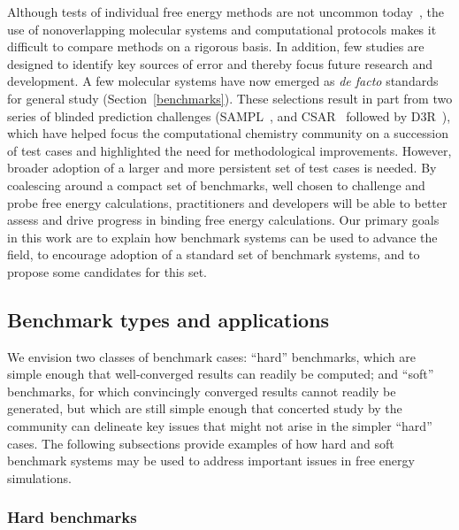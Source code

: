 \documentclass[aps,pre,twocolumn,nofootinbib,superscriptaddress,10pt, final,tightenlines]{revtex4-1}
\begin{document}
Although tests of individual free energy methods are not uncommon today~\cite{mikulskis_large-scale_2014, schrodinger_accurate_2015, christ_binding_2016, cui_affinity_2016, verras_free_2016}, the use of nonoverlapping molecular systems and computational protocols makes it difficult to compare methods on a rigorous basis.
In addition, few studies are designed to identify key sources of error and thereby focus future research and development.
A few molecular systems have now emerged as \emph{de facto} standards for general study (Section~\ref{benchmarks}). 
These selections result in part from two series of blinded prediction challenges (SAMPL~\cite{muddana_sampl4_2014}, and CSAR~\cite{dunbar_csar_2011} followed by D3R~\cite{Gathiaka:2016:JComputAidedMolDes}), which have helped focus the computational chemistry community on a succession of test cases and highlighted the need for methodological improvements. 
However, broader adoption of a larger and more persistent set of test cases is needed. 
By coalescing around a compact set of benchmarks, well chosen to challenge and probe free energy calculations, practitioners and developers will be able to better assess and drive progress in binding free energy calculations. 
Our primary goals in this work are to explain how benchmark systems can be used to advance the field, to encourage adoption of a standard set of benchmark systems, and to propose some candidates for this set.


\subsection{Benchmark types and applications}
\label{subsec:benchmarktypes}
We envision two classes of benchmark cases: ``hard'' benchmarks, which are simple enough that well-converged results can readily be computed; and ``soft'' benchmarks, for which convincingly converged results cannot readily be generated, but which are still simple enough that concerted study by the community can delineate key issues that might not arise in the simpler ``hard'' cases. 
The following subsections provide examples of how hard and soft benchmark systems may be used to address important issues in free energy simulations.

\subsubsection{Hard benchmarks}
\end{document}
